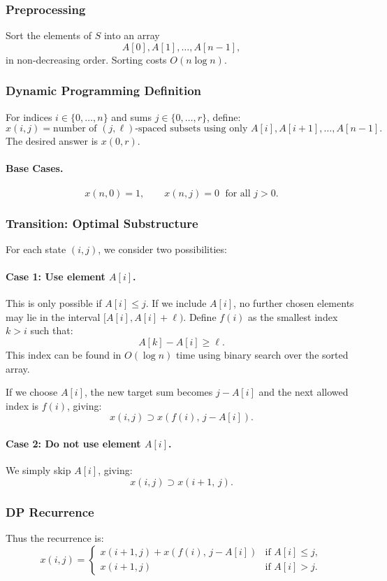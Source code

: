 \documentclass[9pt]{extarticle}
\begin{document}
\subsubsection*{Preprocessing}
Sort the elements of \(S\) into an array
\[
A[0], A[1], \ldots, A[n-1],
\]
in non-decreasing order. Sorting costs \(O(n \log n)\).

\subsubsection*{Dynamic Programming Definition}
For indices \(i \in \{0,\ldots,n\}\) and sums \(j \in \{0,\ldots,r\}\), define:
\[
x(i,j) = \text{number of } (j,\ell)\text{-spaced subsets using only }
A[i],A[i+1],\ldots,A[n-1].
\]
The desired answer is \(x(0,r)\).

\paragraph{Base Cases.}
\[
x(n,0) = 1, \qquad
x(n,j) = 0 \;\text{ for all } j > 0.
\]

\subsubsection*{Transition: Optimal Substructure}
For each state \((i,j)\), we consider two possibilities:

\paragraph{Case 1: Use element \(A[i]\).}
This is only possible if \(A[i] \le j\).  
If we include \(A[i]\), no further chosen elements may lie in the interval
\([A[i], A[i]+\ell)\).  
Define \(f(i)\) as the smallest index \(k > i\) such that:
\[
A[k] - A[i] \ge \ell.
\]
This index can be found in \(O(\log n)\) time using binary search over the sorted array.

If we choose \(A[i]\), the new target sum becomes \(j - A[i]\) and the next
allowed index is \(f(i)\), giving:
\[
x(i,j) \supset x(f(i),\, j - A[i]).
\]

\paragraph{Case 2: Do not use element \(A[i]\).}
We simply skip \(A[i]\), giving:
\[
x(i,j) \supset x(i+1,\, j).
\]

\subsubsection*{DP Recurrence}
Thus the recurrence is:
\[
x(i,j) =
\begin{cases}
    x(i+1,j) + x(f(i),\, j - A[i]) & \text{if } A[i] \le j,\\[3pt]
    x(i+1,j)                       & \text{if } A[i] > j.
\end{cases}
\]
\end{document}

